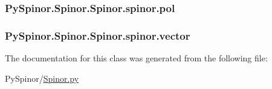 \subsubsection[{pol}]{\setlength{\rightskip}{0pt plus 5cm}Py\+Spinor.\+Spinor.\+Spinor.\+spinor.\+pol}\label{class_py_spinor_1_1_spinor_1_1_spinor_1_1spinor_a44788846d9426038bd780f129ad388c6}
\hypertarget{class_py_spinor_1_1_spinor_1_1_spinor_1_1spinor_ac1325eb3bbd07e47641e42fc150bed3f}{}
\subsubsection[{vector}]{\setlength{\rightskip}{0pt plus 5cm}Py\+Spinor.\+Spinor.\+Spinor.\+spinor.\+vector}\label{class_py_spinor_1_1_spinor_1_1_spinor_1_1spinor_ac1325eb3bbd07e47641e42fc150bed3f}


The documentation for this class was generated from the following file\+:\begin{DoxyCompactItemize}
\item 
Py\+Spinor/\hyperlink{_spinor_8py}{Spinor.\+py}\end{DoxyCompactItemize}
